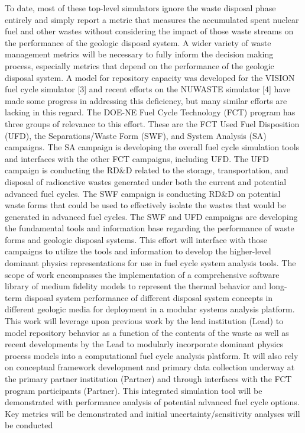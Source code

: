 To date, most of these top-level simulators ignore the waste disposal 
phase entirely and simply report a metric that measures the 
accumulated spent nuclear fuel and other wastes without considering 
the impact of those waste streams on the performance of the geologic 
disposal system.  A wider variety of waste management metrics will be 
necessary to fully inform the decision making process, especially 
metrics that depend on the performance of the geologic disposal 
system.  A model for repository capacity was developed for the VISION 
fuel cycle simulator [3] and recent efforts on the NUWASTE simulator 
[4] have made some progress in addressing this deficiency, but many 
similar efforts are lacking in this regard.  The DOE-NE Fuel Cycle 
Technology (FCT) program has three groups of relevance to this effort.  
These are the FCT Used Fuel Disposition (UFD), the Separations/Waste 
Form (SWF), and System Analysis (SA) campaigns.  The SA campaign is 
developing the overall fuel cycle simulation tools and interfaces with 
the other FCT campaigns, including UFD.  The UFD campaign is 
conducting the RD\&D related to the storage, transportation, and 
disposal of radioactive wastes generated under both the current and 
potential advanced fuel cycles.  The SWF campaign is conducting RD\&D 
on potential waste forms that could be used to effectively isolate the 
wastes that would be generated in advanced fuel cycles.  The SWF and 
UFD campaigns are developing the fundamental tools and information 
base regarding the performance of waste forms and geologic disposal 
systems.  This effort will interface with those campaigns to utilize 
the tools and information to develop the higher-level dominant physics 
representations for use in fuel cycle system analysis tools.  The 
scope of work encompasses the implementation of a comprehensive 
software library of medium fidelity models to represent the thermal 
behavior and long-term disposal system performance of different 
disposal system concepts in different geologic media for deployment in 
a modular systems analysis platform.  This work will leverage upon 
previous work by the lead institution (Lead) to model repository 
behavior as a function of the contents of the waste as well as recent 
developments by the Lead to modularly incorporate dominant physics 
process models into a computational fuel cycle analysis platform.  It 
will also rely on conceptual framework development and primary data 
collection underway at the primary partner institution (Partner) and 
through interfaces with the FCT program participants (Partner).  This 
integrated simulation tool will be demonstrated with performance 
analysis of potential advanced fuel cycle options.  Key metrics will 
be demonstrated and initial uncertainty/sensitivity analyses will be 
conducted

